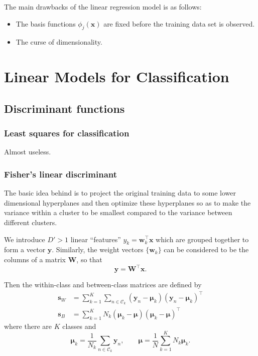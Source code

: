 \documentclass[a4paper]{book}
\renewcommand{\bf}{\mathbf}
\renewcommand{\cal}{\mathcal}
\newcommand{\bs}{\boldsymbol}
\begin{document}
The main drawbacks of the linear regression model is as follows:
\begin{itemize}
	 \item The basis functions $\phi_j(\bf{x})$ are fixed before the training data set is observed.
	 \item The curse of dimensionality.
\end{itemize}
\section{Linear Models for Classification}
\subsection{Discriminant functions}
\subsubsection{Least squares for classification}
Almost useless.
\subsubsection{Fisher's linear discriminant}
The basic idea behind is to project the original training data to some lower dimensional hyperplanes and then optimize these hyperplanes so as to make the variance within a cluster to be smallest compared to the variance between different clusters.

We introduce $D' > 1$ linear ``features'' $y_k = \bf{w}_k^{\intercal} \bf{x}$ which are grouped together to form a vector $\bf{y}$. Similarly, the weight vectors $\{ \bf{w}_k \}$ can be considered to be the columns of a matrix $\bf{W}$, so that
\begin{equation}
	\bf{y} = \bf{W}^{\intercal} \bf{x}.
\end{equation}

Then the within-class and between-class matrices are defined by
\begin{align}
	\bf{s}_W &= \sum_{k=1}^K \sum_{n\in \cal{C}_k} (\bf{y}_n - \bs{\mu}_k)(\bf{y}_n - \bs{\mu}_k)^{\intercal} \\
	\bf{s}_B &= \sum_{k=1}^K N_k (\bs{\mu}_k -\bs{\mu})(\bs{\mu}_k-\bs{\mu})^{\intercal}
\end{align}
where there are $K$ classes and
\begin{equation}
	\bs{\mu}_k = \frac{1}{N_k} \sum_{n \in \cal{C}_k} \bf{y}_n, \qquad \bs{\mu} = \frac{1}{N} \sum_{k=1}^{K}N_k \bs{\mu}_k.
\end{equation}
\end{document}
